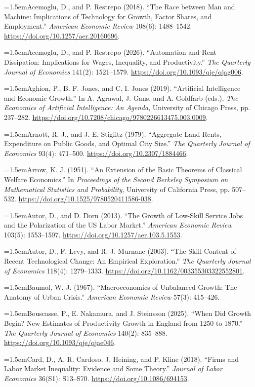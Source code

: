 \documentclass[12pt]{article}
\theoremstyle{plain}
\theoremstyle{definition}
\theoremstyle{remark}
\newcommand{\refentry}[1]{\par\hangindent=1.5em\hangafter=1\noindent #1}
\begin{document}
{\small\singlespacing
\sloppy
\refentry{Acemoglu, D., and P. Restrepo (2018). ``The Race between Man and Machine: Implications of Technology for Growth, Factor Shares, and Employment.'' \emph{American Economic Review} 108(6): 1488--1542. \url{https://doi.org/10.1257/aer.20160696}.}
\refentry{Acemoglu, D., and P. Restrepo (2026). ``Automation and Rent Dissipation: Implications for Wages, Inequality, and Productivity.'' \emph{The Quarterly Journal of Economics} 141(2): 1521--1579. \url{https://doi.org/10.1093/qje/qjag006}.}
\refentry{Aghion, P., B. F. Jones, and C. I. Jones (2019). ``Artificial Intelligence and Economic Growth.'' In A. Agrawal, J. Gans, and A. Goldfarb (eds.), \emph{The Economics of Artificial Intelligence: An Agenda}, University of Chicago Press, pp. 237--282. \url{https://doi.org/10.7208/chicago/9780226613475.003.0009}.}
\refentry{Arnott, R. J., and J. E. Stiglitz (1979). ``Aggregate Land Rents, Expenditure on Public Goods, and Optimal City Size.'' \emph{The Quarterly Journal of Economics} 93(4): 471--500. \url{https://doi.org/10.2307/1884466}.}
\refentry{Arrow, K. J. (1951). ``An Extension of the Basic Theorems of Classical Welfare Economics.'' In \emph{Proceedings of the Second Berkeley Symposium on Mathematical Statistics and Probability}, University of California Press, pp. 507--532. \url{https://doi.org/10.1525/9780520411586-038}.}
\refentry{Autor, D., and D. Dorn (2013). ``The Growth of Low-Skill Service Jobs and the Polarization of the US Labor Market.'' \emph{American Economic Review} 103(5): 1553--1597. \url{https://doi.org/10.1257/aer.103.5.1553}.}
\refentry{Autor, D., F. Levy, and R. J. Murnane (2003). ``The Skill Content of Recent Technological Change: An Empirical Exploration.'' \emph{The Quarterly Journal of Economics} 118(4): 1279--1333. \url{https://doi.org/10.1162/003355303322552801}.}
\refentry{Baumol, W. J. (1967). ``Macroeconomics of Unbalanced Growth: The Anatomy of Urban Crisis.'' \emph{American Economic Review} 57(3): 415--426.}
\refentry{Bouscasse, P., E. Nakamura, and J. Steinsson (2025). ``When Did Growth Begin? New Estimates of Productivity Growth in England from 1250 to 1870.'' \emph{The Quarterly Journal of Economics} 140(2): 835--888. \url{https://doi.org/10.1093/qje/qjae046}.}
\refentry{Card, D., A. R. Cardoso, J. Heining, and P. Kline (2018). ``Firms and Labor Market Inequality: Evidence and Some Theory.'' \emph{Journal of Labor Economics} 36(S1): S13--S70. \url{https://doi.org/10.1086/694153}.}
}
\end{document}
